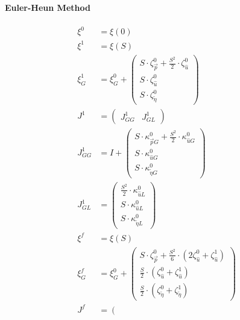 \documentclass[review]{elsarticle}
\begin{document}
\paragraph{Euler-Heun Method}
\begin{equation} \begin{alignedat}{-1}
    \xi^{0}&=\xi\left(0\right) \\
    \xi^{1}&=\xi\left(S\right) \\
    \xi_{G}^{1}&=\xi_{G}^{0}+\left(\begin{array}{l}
        S\cdot\zeta_{\vec{p}}^{0}+\frac{S^{2}}{2}\cdot\zeta_{\hat{u}}^{0}\\
        S\cdot\zeta_{\hat{u}}^{0}\\
        S\cdot\zeta_{\tilde{\eta}}^{0}
    \end{array}\right) \\
    J^{1}&=\left(\begin{array}{cc}
        J_{GG}^{1} & J_{GL}^{1}
    \end{array}\right) \\
    J_{GG}^{1}&=I+\left(\begin{array}{l}
        S\cdot\kappa_{\vec{p}G}^{0}+\frac{S^{2}}{2}\cdot\kappa_{\hat{u}G}^{0}\\
        S\cdot\kappa_{\hat{u}G}^{0}\\
        S\cdot\kappa_{\tilde{\eta}G}^{0}
    \end{array}\right)\\
    J_{GL}^{1}&=\left(\begin{array}{l}
        \frac{S^{2}}{2}\cdot\kappa_{\hat{u}L}^{0}\\
        S\cdot\kappa_{\hat{u}L}^{0}\\
        S\cdot\kappa_{\tilde{\eta}L}^{0}
    \end{array}\right) \\
    \xi^{f}&=\xi\left(S\right) \\
    \xi_{G}^{f}&=\xi_{G}^{0}+\left(\begin{array}{l}
        S\cdot\zeta_{\vec{p}}^{0}+\frac{S^{2}}{6}\cdot\left(2\zeta_{\hat{u}}^{0}+\zeta_{\hat{u}}^{1}\right)\\
        \frac{S}{2}\cdot\left(\zeta_{\hat{u}}^{0}+\zeta_{\hat{u}}^{1}\right)\\
        \frac{S}{2}\cdot\left(\zeta_{\tilde{\eta}}^{0}+\zeta_{\tilde{\eta}}^{1}\right)
    \end{array}\right) \\
    J^{f}&=\left(\begin{array}{cc}

\end{array}
\end{alignedat}
\end{equation}
\end{document}
